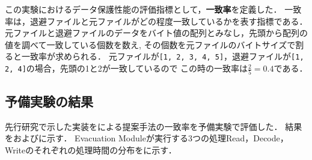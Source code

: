 この実験におけるデータ保護性能の評価指標として，\textbf{一致率}を定義した．
一致率は，退避ファイルと元ファイルがどの程度一致しているかを表す指標である．
元ファイルと退避ファイルのデータをバイト値の配列とみなし，先頭から配列の値を調べて一致している個数を数え,
その個数を元ファイルのバイトサイズで割ると一致率が求められる．
元ファイルが\texttt{[1, 2, 3, 4, 5]}，退避ファイルが\texttt{[1, 2, 4]}の場合，先頭の1と2が一致しているので
この時の一致率は$\frac{2}{5}=0.4$である．

\subsection{予備実験の結果}
先行研究\cite{css2024}で示した実装をによる提案手法の一致率を予備実験で評価した．
結果をおよびに示す．
Evacuation Moduleが実行する3つの処理Read，Decode，Writeのそれぞれの処理時間の分布をに示す．
